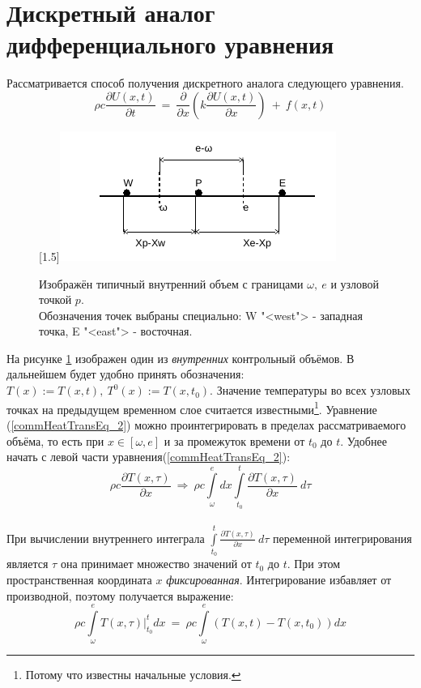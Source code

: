 \documentclass[oneside, final, 14pt]{report}
\begin{document}
\section{Дискретный аналог дифференциального уравнения}
Рассматривается способ получения дискретного аналога следующего уравнения. 
\begin{equation}
\rho c\frac{\partial U(x,t)}{\partial t} \ = \ \frac{\partial}{\partial x}(k\frac{\partial U(x,t)}{\partial x}) \ + \ f(x,t) \label{eq_HeatTransEq_2} 
\end{equation}
\begin{figure}[h!]
 \centering
 \scalebox{2}[1.5]{\includegraphics{../img_pdf_cropped/inside_vol}}
 \caption{Изображён типичный внутренний объем с границами $\omega, \ e$ и узловой точкой $p$. \\ Обозначения точек выбраны специально: W "<west"> - западная точка, E "<east"> - восточная. }
 \label{inside_vol}
\end{figure}
\label{integ_diffur}
На рисунке \ref{inside_vol} изображен один из \emph{внутренних} контрольный объёмов. В дальнейшем будет удобно принять обозначения: $T(x) := T(x, t), \ T^0(x) := T(x, t_0)$. Значение температуры во всех узловых точках на предыдущем временном слое считается известными\footnote{Потому что известны начальные условия.}. Уравнение (\ref{commHeatTransEq_2}) можно проинтегрировать в пределах рассматриваемого объёма, то есть при $x \in [\omega, e] $ и за промежуток времени от $t_0$ до $t$. Удобнее начать с левой части уравнения(\ref{commHeatTransEq_2}):
\[
\rho c\frac{\partial T(x, \tau)}{\partial x} \ \Rightarrow \ \rho c\int\limits_{\omega}^e dx \int\limits_{t_0}^t \frac{\partial T(x,\tau)}{\partial x}\ d\tau 
\] 
\\ 
При вычислении внутреннего интеграла $\int\limits_{t_0}^t \frac{\partial T(x,\tau)}{\partial x}\ d\tau$ переменной интегрирования является $\tau$ она принимает множество значений от $t_0$ до $t$. При этом пространственная координата $x$ \emph{фиксированная}. Интегрирование избавляет от производной, поэтому получается выражение: 
\[
\rho c\int\limits_{\omega}^eT(x, \tau)|_{t_0}^t dx \ = \
\rho c\int\limits_{\omega}^e\left(T(x, t) - T(x, t_0)\right) dx
\]
\end{document}
